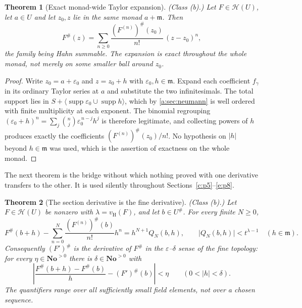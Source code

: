 \documentclass[11pt,a4paper]{article}
\numberwithin{equation}{section}
\newtheorem{theorem}{Theorem}[section]
\theoremstyle{definition}
\theoremstyle{remark}
\theoremstyle{plain}
\newcommand{\No}{\mathbf{No}}
\newcommand{\mm}{\mathfrak m}
\DeclareMathOperator{\supp}{supp}
\newcommand{\tm}{t}
\newcommand{\halo}[1]{#1^{\#}}
\newcommand{\ev}[1]{#1^{\#}}
\newcommand{\Hc}{\mathcal H}
\newcommand{\vH}{v_{\mathrm H}}
\newcommand{\Neu}[1]{\langle #1\rangle}
\newcommand{\abs}[1]{\lvert #1\rvert}
\begin{document}
\begin{theorem}[Exact monad-wide Taylor expansion]\label{c:p4:monadtaylor}
\emph{(Class (b).)} Let $F\in\Hc(U)$, let $a\in U$ and let
$z_0,z$ lie in the same monad $a+\mm$. Then
\begin{equation}\label{c:p4:eq-monadtaylor}
 \ev F(z)=\sum_{n\ge0}\frac{\ev{(F^{(n)})}(z_0)}{n!}\,(z-z_0)^n,
\end{equation}
the family being Hahn summable. The expansion is exact
\emph{throughout the whole monad}, not merely on some smaller ball
around $z_0$.
\end{theorem}

\begin{proof}
Write $z_0=a+\varepsilon_0$ and $z=z_0+h$ with
$\varepsilon_0,h\in\mm$. Expand each coefficient $f_\gamma$ in its
ordinary Taylor series at $a$ and substitute the two infinitesimals.
The total support lies in $S+\Neu{\supp\varepsilon_0\cup\supp h}$, which
by \ref{a:sec:neumann} is well ordered with finite multiplicity at each
exponent. The binomial regrouping
$(\varepsilon_0+h)^n=\sum_j\binom nj\varepsilon_0^{\,n-j}h^{j}$ is
therefore legitimate, and collecting powers of $h$ produces exactly the
coefficients $\ev{(F^{(n)})}(z_0)/n!$. No hypothesis on $\abs h$ beyond
$h\in\mm$ was used, which is the assertion of exactness on the whole
monad.
\end{proof}

The next theorem is the bridge without which nothing proved with one
derivative transfers to the other. It is used silently throughout
Sections~\ref{c:p5}--\ref{e:p8}.

\begin{theorem}[The section derivative is the fine derivative]
\label{c:p4:derivbridge}
\emph{(Class (b).)} Let $F\in\Hc(U)$ be nonzero with
$\lambda=\vH(F)$, and let $b\in\halo U$. For every finite $N\ge0$,
\begin{equation}\label{c:p4:eq-remainder}
 \ev F(b+h)-\sum_{n=0}^{N}\frac{\ev{(F^{(n)})}(b)}{n!}h^n
 =h^{N+1}Q_N(b,h),
 \qquad \abs{Q_N(b,h)}<\tm^{\lambda-1}
 \quad(h\in\mm).
\end{equation}
Consequently $\ev{(F')}$ is the derivative of $\ev F$ in the
$\varepsilon$--$\delta$ sense of the fine topology: for every
$\eta\in\No^{>0}$ there is $\delta\in\No^{>0}$ with
\[
 \left|\frac{\ev F(b+h)-\ev F(b)}{h}-\ev{(F')}(b)\right|<\eta
 \qquad(0<\abs h<\delta).
\]
The quantifiers range over all sufficiently small field elements, not
over a chosen sequence.
\end{theorem}
\end{document}
